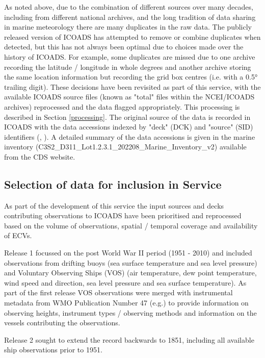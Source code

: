 As noted above, due to the combination of different sources over many decades, including from different national archives, and the long tradition of data sharing in marine meteorology there are many duplicates in the raw data. 
The publicly released version of ICOADS has attempted to remove or combine duplicates when detected, but this has not always been optimal due to choices made over the history of ICOADS. 
For example, some duplicates are missed due to one archive recording the latitude / longitude in whole degrees and another archive storing the same location information but recording the grid box centres (i.e. with a 0.5° trailing digit). 
These decisions have been revisited as part of this service, with the available ICOADS source files (known as "total" files within the NCEI/ICOADS archives) reprocessed and the data flagged appropriately.
This processing is described in Section \ref{processing}.
The original source of the data is recorded in ICOADS with the data accessions indexed by "deck" (DCK) and "source" (SID) identifiers (\cite{Woodruff1987}, \cite{Freeman2017}). 
A detailed summary of the data accessions is given in the marine inventory (C3S2\_D311\_Lot1.2.3.1\_202208\_Marine\_Inventory\_v2) available from the CDS website.

\subsection{Selection of data for inclusion in Service}
As part of the development of this service the input sources and decks contributing observations to ICOADS have been prioritised and reprocessed based on the volume of observations, spatial / temporal coverage and availability of ECVs.

Release 1 focussed on the post World War II period (1951 - 2010) and included observations from drifting buoys (sea surface temperature and sea level pressure) and Voluntary Observing Ships (VOS) (air temperature, dew point temperature, wind speed and direction, sea level pressure and sea surface temperature).
As part of the first release VOS observations were merged with instrumental metadata from WMO Publication Number 47 (e.g.\cite{Kent2007}) to provide information on observing heights, instrument types / observing methods and information on the vessels contributing the observations. 

Release 2 sought to extend the record backwards to 1851, including all available ship observations prior to 1951.

